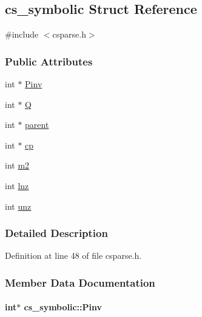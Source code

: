 \hypertarget{structcs__symbolic}{\subsection{cs\-\_\-symbolic Struct Reference}
\label{structcs__symbolic}
}


{\ttfamily \#include $<$csparse.\-h$>$}

\subsubsection*{Public Attributes}
\begin{DoxyCompactItemize}
\item 
int $\ast$ \hyperlink{structcs__symbolic_a095ba468af8cb63c4cecf46a1adb45ac}{Pinv}
\item 
int $\ast$ \hyperlink{structcs__symbolic_afcefa00ab98cf91d2258dc5a63f7dd6d}{Q}
\item 
int $\ast$ \hyperlink{structcs__symbolic_aefc6fc6ae59f5c51b225c93a549b6838}{parent}
\item 
int $\ast$ \hyperlink{structcs__symbolic_a85eed6fd134282ada142ebaae0fe2403}{cp}
\item 
int \hyperlink{structcs__symbolic_a6e76dde6232a98e3b5d96d942c08b12e}{m2}
\item 
int \hyperlink{structcs__symbolic_acfb8969ebae172c2efcc82e1b98ef826}{lnz}
\item 
int \hyperlink{structcs__symbolic_ad20740ef6e60d2a90e12860c0bf6aab7}{unz}
\end{DoxyCompactItemize}


\subsubsection{Detailed Description}


Definition at line 48 of file csparse.\-h.



\subsubsection{Member Data Documentation}
\hypertarget{structcs__symbolic_a095ba468af8cb63c4cecf46a1adb45ac}{
\paragraph[{Pinv}]{\setlength{\rightskip}{0pt plus 5cm}int$\ast$ cs\-\_\-symbolic\-::\-Pinv}}\label{structcs__symbolic_a095ba468af8cb63c4cecf46a1adb45ac}



